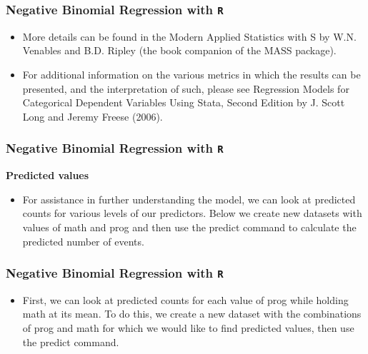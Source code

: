 \documentclass[00-GLMregslides.tex]{subfiles}
\begin{document}
\begin{frame}[fragile]
	\frametitle{Negative Binomial Regression with \texttt{R} }
	\Large
	\begin{itemize}
\item More details can be found in the Modern Applied Statistics with S by W.N. Venables and B.D. Ripley (the book companion of the MASS package).

\item 	For additional information on the various metrics in which the results can be presented, and the interpretation of such, please see Regression Models for Categorical Dependent Variables Using Stata, Second Edition by J. Scott Long and Jeremy Freese (2006).
\end{itemize}
\end{frame}
\begin{frame}[fragile]
	\frametitle{Negative Binomial Regression with \texttt{R} }
	\Large
	
	\textbf{Predicted values}
	\begin{itemize}
\item	For assistance in further understanding the model, we can look at predicted counts for various levels of our predictors. Below we create new datasets with values of math and prog and then use the predict command to calculate the predicted number of events.
\end{itemize}
\end{frame}
\begin{frame}[fragile]
	\frametitle{Negative Binomial Regression with \texttt{R} }
	\Large
	
	\begin{itemize}
\item	First, we can look at predicted counts for each value of prog while holding math at its mean. To do this, we create a new dataset with the combinations of prog and math for which we would like to find predicted values, then use the predict command.
\end{itemize}
\end{frame}
\end{document}
